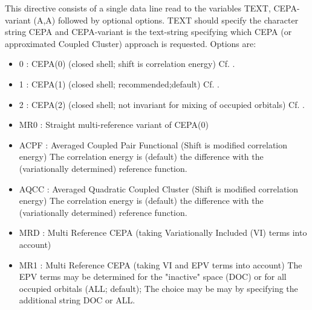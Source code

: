 \documentclass[11pt,fleqn]{article}
\begin{document}
This directive consists of a single data line read to the variables 
TEXT, CEPA-variant (A,A) followed by optional options.  
TEXT should specify the character string CEPA and
CEPA-variant is the text-string specifying which CEPA (or
approximated Coupled Cluster) approach is requested. Options are:
\begin{itemize}
\item 0    : CEPA(0) (closed shell; shift is correlation energy)
      Cf.    \cite{ref:41}.
\item 1    : CEPA(1) (closed shell; recommended;default)
      Cf.    \cite{ref:41}.
\item 2    : CEPA(2) (closed shell; not invariant for mixing of 
             occupied orbitals) Cf. \cite{ref:41}.
\item MR0  : Straight multi-reference variant of CEPA(0)
\item ACPF : Averaged Coupled Pair Functional (Shift is 
             modified correlation energy) \cite{ref:ACPF}
             The correlation energy is (default) the difference with the
             (variationally determined) reference function.
\item AQCC : Averaged Quadratic Coupled Cluster (Shift is 
             modified correlation energy) \cite{ref:AQCC}
             The correlation energy is (default) the difference with the
             (variationally determined) reference function.
\item MRD  : Multi Reference CEPA (taking Variationally Included
             (VI) terms into account) \cite{ref:51}
\item MR1  : Multi Reference CEPA (taking VI and EPV terms 
             into account) \cite{ref:Szalay,ref:MRCEPA1}
             The EPV terms may be determined for the "inactive"
             space (DOC) or for all occupied orbitals (ALL; default);
             The choice may be may by specifying the additional
             string DOC or ALL.
\end{itemize}
\end{document}
